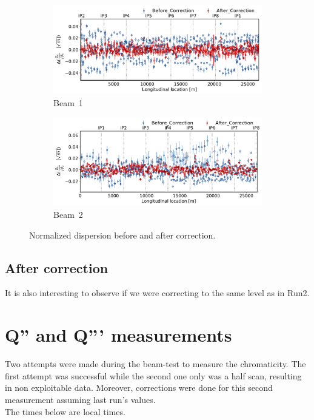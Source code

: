 \documentclass[a4paper]{cernatsnote}
\begin{document}
\begin{figure}[ht]
\begin{subfigure}{.5\textwidth}
  \centering
  \includegraphics[width=.8\linewidth]{plots/beam1/Normalized_disp_before_vs_after_corection.pdf}  
  \caption{Beam~1}
\end{subfigure}
\begin{subfigure}{.5\textwidth}
  \centering
  \includegraphics[width=.8\linewidth]{plots/beam2/ndisp_before_after_correction.pdf}  
  \caption{Beam~2}
\end{subfigure}
\caption{Normalized dispersion before and after correction.}
\label{fig:before_after_correction_beta_beat}
\end{figure}

\subsection{After correction}
It is also interesting to observe if we were correcting to the same level as in Run2. 

\clearpage
\section{Q'' and Q''' measurements}

Two attempts were made during the beam-test to measure the chromaticity. The first attempt was successful while the second one only was a half scan, resulting in non exploitable data. Moreover, corrections were done for this second measurement assuming last run's values.\\
The times below are local times.
\end{document}
